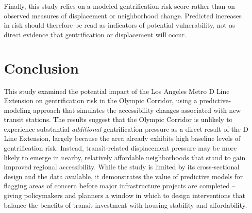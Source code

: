 \documentclass[11pt]{article}
\begin{document}
Finally, this study relies on a modeled gentrification-risk score rather than on observed measures of displacement or neighborhood change. Predicted increases in risk should therefore be read as indicators of potential vulnerability, not as direct evidence that gentrification or displacement will occur.

\section{Conclusion}

This study examined the potential impact of the Los Angeles Metro D Line Extension on gentrification risk in the Olympic Corridor, using a predictive-modeling approach that simulates the accessibility changes associated with new transit stations. The results suggest that the Olympic Corridor is unlikely to experience substantial \emph{additional} gentrification pressure as a direct result of the D Line Extension, largely because the area already exhibits high baseline levels of gentrification risk. Instead, transit-related displacement pressure may be more likely to emerge in nearby, relatively affordable neighborhoods that stand to gain improved regional accessibility. While the study is limited by its cross-sectional design and the data available, it demonstrates the value of predictive models for flagging areas of concern before major infrastructure projects are completed -- giving policymakers and planners a window in which to design interventions that balance the benefits of transit investment with housing stability and affordability.



\end{document}

